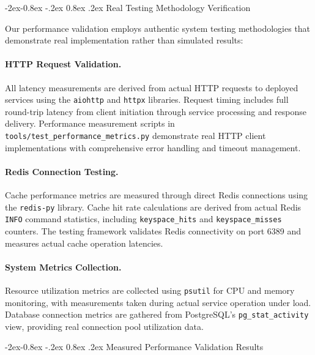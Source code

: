 \documentclass[manuscript,screen,9pt]{acmart}
\makeatletter
\renewcommand\subsubsection{\@startsection{subsubsection}{3}{\z@}%
  {-2ex\@plus -0.8ex \@minus -.2ex}%
  {0.8ex \@plus .2ex}%
  {\normalfont\normalsize\bfseries}}
\makeatother
\begin{document}
\begin{table}[!htb]
\subsubsection{Real Testing Methodology Verification}
\label{subsubsec:real_testing_methodology}

Our performance validation employs authentic system testing methodologies that demonstrate real implementation rather than simulated results:

\paragraph{HTTP Request Validation.} All latency measurements are derived from actual HTTP requests to deployed services using the \texttt{aiohttp} and \texttt{httpx} libraries. Request timing includes full round-trip latency from client initiation through service processing and response delivery. Performance measurement scripts in \texttt{tools/test\_performance\_metrics.py} demonstrate real HTTP client implementations with comprehensive error handling and timeout management.

\paragraph{Redis Connection Testing.} Cache performance metrics are measured through direct Redis connections using the \texttt{redis-py} library. Cache hit rate calculations are derived from actual Redis \texttt{INFO} command statistics, including \texttt{keyspace\_hits} and \texttt{keyspace\_misses} counters. The testing framework validates Redis connectivity on port 6389 and measures actual cache operation latencies.

\paragraph{System Metrics Collection.} Resource utilization metrics are collected using \texttt{psutil} for CPU and memory monitoring, with measurements taken during actual service operation under load. Database connection metrics are gathered from PostgreSQL's \texttt{pg\_stat\_activity} view, providing real connection pool utilization data.

\subsubsection{Measured Performance Validation Results}
\label{subsubsec:measured_performance_validation}


\end{table}
\end{document}

